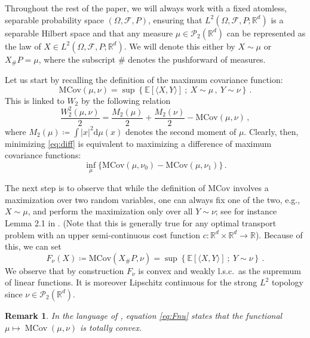 \documentclass[12pt]{amsart}
\numberwithin{equation}{section}
\let\mc=\mathcal
\let\mr=\mathrm
\def\ed{\mathrm{d}}
\theoremstyle{plain}
\newtheorem{remark}[theorem]{Remark}
\theoremstyle{definition}
\begin{document}
Throughout the rest of the paper, we will always work with a fixed atomless, separable probability space $(\Omega, \mathcal{F}, P)$, ensuring that $ L^2(\Omega, \mc{F}, P; \mathbb{R}^d)$ is a separable Hilbert space and that any measure  $\mu \in \mc{P}_2(\mathbb{R}^d)$ can be represented as the law of $X \in L^2(\Omega, \mc{F}, P; \mathbb{R}^d)$. We will denote this either by $X\sim \mu$ or $X_\# P = \mu$, where the subscript $\#$  denotes the pushforward of measures.

Let us start by recalling the definition of the maximum covariance function:
\begin{equation}\label{eq:mcov}
\mr{MCov}(\mu,\nu) = \sup\left\{ \mathbb{E}[\langle X,Y \rangle] ~ ; ~ X \sim \mu \,, ~Y \sim \nu \right\}\,.
\end{equation}
This is linked to $W_2$ by the following relation
\[
\frac{W^2_2(\mu,\nu)}{2} = \frac{M_2(\mu)}{2} + \frac{M_2(\nu)}{2} - \mr{MCov}(\mu,\nu)\,,
\]
where $M_2(\mu) \coloneqq \int |x|^2 \ed \mu(x)$ denotes the second moment of $\mu$.
Clearly, then,  minimizing \eqref{eq:diff} is equivalent to maximizing a difference of maximum covariance functions:
\begin{equation}\label{eq:diffmcov}
\inf_\mu \{\mr{MCov}(\mu,\nu_0) - \mr{MCov}(\mu,\nu_1)\}\,.
\end{equation}

The next step is to observe that while the definition of $\mr{MCov}$ involves a maximization over two random variables, one can always fix one of the two,  e.g., $X \sim \mu$, and perform the maximization only over all $Y \sim  \nu$; see for instance Lemma 2.1 in \cite{bertucci2024approximation}.
(Note that this is generally true for any optimal transport problem with an upper semi-continuous cost function  $c:\mathbb{R}^d\times \mathbb{R}^d \rightarrow \mathbb{R}$). 
Because of this, we can set
\begin{equation}\label{eq:Fnu}
F_\nu(X) \coloneqq \mathrm{MCov}(X_\# P, \nu)= \sup\left\{ \mathbb{E}[\langle X,Y \rangle] ~ ; ~ Y \sim \nu \right\}\,.
\end{equation}
We observe that by construction $F_\nu$ is convex and weakly l.s.c.\ as the supremum of linear functions. It is moreover Lipschitz continuous for the strong $L^2$ topology since $\nu\in\mc{P}_2(\mathbb{R}^d)$. 

\begin{remark}
In the language of \cite{pinzi2025totally}, equation \eqref{eq:Fnu} states that the functional $\mu \mapsto \operatorname{MCov}(\mu,\nu)$ is totally convex.
\end{remark}
\end{document}
